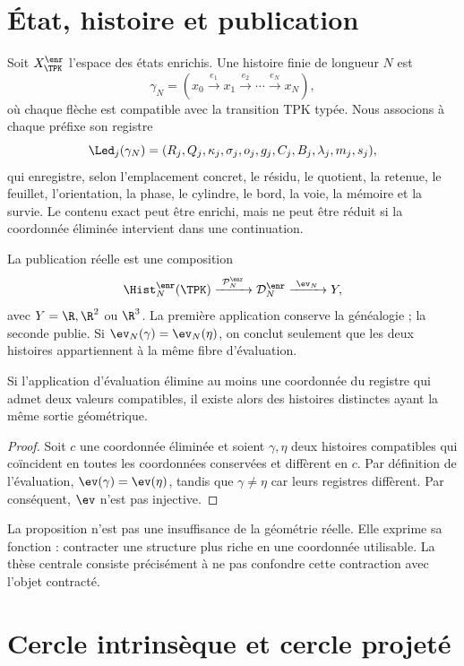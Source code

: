 \section{État, histoire et publication}

Soit \(X_{\TPK}^{\enr}\) l'espace des états enrichis. Une histoire finie de longueur \(N\) est
\[
 \gamma_N=(x_0\xrightarrow{e_1}x_1\xrightarrow{e_2}\cdots
 \xrightarrow{e_N}x_N),
\]
où chaque flèche est compatible avec la transition TPK typée. Nous associons à chaque préfixe son registre
\[
 \Led_j(\gamma_N)=
 (R_j,Q_j,\kappa_j,\sigma_j,o_j,g_j,C_j,B_j,
  \lambda_j,m_j,s_j),
\]
qui enregistre, selon l'emplacement concret, le résidu, le quotient, la retenue, le feuillet, l'orientation, la phase, le cylindre, le bord, la voie, la mémoire et la survie. Le contenu exact peut être enrichi, mais ne peut être réduit si la coordonnée éliminée intervient dans une continuation.

La publication réelle est une composition
\[
 \Hist_N^{\enr}(\TPK)
 \xrightarrow{\ \mathcal P_N^{\enr}\ }
 \mathcal D_N^{\enr}
 \xrightarrow{\ \ev_N\ }
 Y,
\]
avec \(Y=\R,\R^2\) ou \(\R^3\). La première application conserve la généalogie ; la seconde publie. Si \(\ev_N(\gamma)=\ev_N(\eta)\), on conclut seulement que les deux histoires appartiennent à la même fibre d'évaluation.

\begin{proposition}
Si l'application d'évaluation élimine au moins une coordonnée du registre qui admet deux valeurs compatibles, il existe alors des histoires distinctes ayant la même sortie géométrique.
\end{proposition}
\begin{proof}
Soit \(c\) une coordonnée éliminée et soient \(\gamma,\eta\) deux histoires compatibles qui coïncident en toutes les coordonnées conservées et diffèrent en \(c\). Par définition de l'évaluation, \(\ev(\gamma)=\ev(\eta)\), tandis que \(\gamma\neq\eta\) car leurs registres diffèrent. Par conséquent, \(\ev\) n'est pas injective.
\end{proof}

La proposition n'est pas une insuffisance de la géométrie réelle. Elle exprime sa fonction : contracter une structure plus riche en une coordonnée utilisable. La thèse centrale consiste précisément à ne pas confondre cette contraction avec l'objet contracté.

\section{Cercle intrinsèque et cercle projeté}

